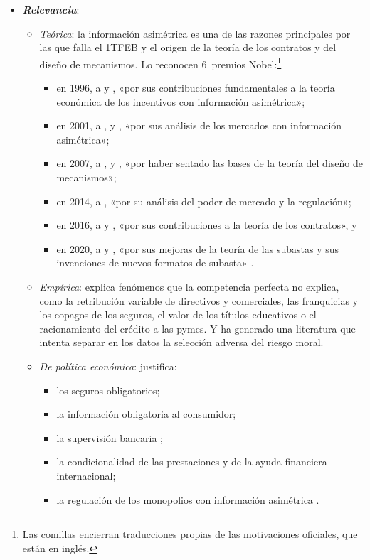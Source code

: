 \documentclass[11pt]{article}
\begin{document}
\begin{itemize}
\item \textbf{\emph{Relevancia}}:
  \begin{itemize}
  \item \emph{Teórica}: la información asimétrica es una de las razones principales por las que falla el 1TFEB y el origen de la teoría de los contratos y del diseño de mecanismos. Lo reconocen 6~premios Nobel:\footnote{Las comillas encierran traducciones propias de las motivaciones oficiales, que están en inglés.}
    \begin{itemize}
    \item en 1996, a  y , «por sus contribuciones fundamentales a la teoría económica de los incentivos con información asimétrica»\nocite{Nobel1996MirrleesVickrey};
    \item en 2001, a ,  y , «por sus análisis de los mercados con información asimétrica»\nocite{Nobel2001AkerlofSpenceStiglitz};
    \item en 2007, a ,  y , «por haber sentado las bases de la teoría del diseño de mecanismos»\nocite{Nobel2007HurwiczMaskinMyerson};
    \item en 2014, a , «por su análisis del poder de mercado y la regulación»\nocite{Nobel2014Tirole};
    \item en 2016, a  y , «por sus contribuciones a la teoría de los contratos»\nocite{Nobel2016HartHolmstrom}, y
    \item en 2020, a  y , «por sus mejoras de la teoría de las subastas y sus invenciones de nuevos formatos de subasta»\nocite{Nobel2020MilgromWilson} .
    \end{itemize}
  \item \emph{Empírica}: explica fenómenos que la competencia perfecta no explica, como la retribución variable de directivos y comerciales, las franquicias y los copagos de los seguros, el valor de los títulos educativos o el racionamiento del crédito a las pymes. Y ha generado una literatura que intenta separar en los datos la selección adversa del riesgo moral\nocite{ChiapporiSalanie2000Testing,EinavFinkelstein2011Selection}.
  \item \emph{De política económica}: justifica:
    \begin{itemize}
    \item los seguros obligatorios;
    \item la información obligatoria al consumidor;
    \item la supervisión bancaria ;
    \item la condicionalidad de las prestaciones y de la ayuda financiera internacional;
    \item la regulación de los monopolios con información asimétrica .
    \end{itemize}
  \end{itemize}


\end{itemize}
\end{document}
